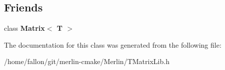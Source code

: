 \subsection*{Friends}
\begin{DoxyCompactItemize}
\item 
\mbox{\label{classTLAS_1_1SubMatrix_a17fc06682c9f9c46f1e0e38b7af25b80}} 
class {\bfseries Matrix$<$ T $>$}
\end{DoxyCompactItemize}


The documentation for this class was generated from the following file\+:\begin{DoxyCompactItemize}
\item 
/home/fallon/git/merlin-\/cmake/\+Merlin/T\+Matrix\+Lib.\+h\end{DoxyCompactItemize}
